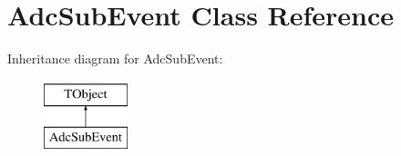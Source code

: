 \hypertarget{class_adc_sub_event}{\section{Adc\-Sub\-Event Class Reference}
\label{class_adc_sub_event}
}
Inheritance diagram for Adc\-Sub\-Event\-:\begin{figure}[H]
\begin{center}
\leavevmode
\includegraphics[height=2.000000cm]{class_adc_sub_event}
\end{center}
\end{figure}
